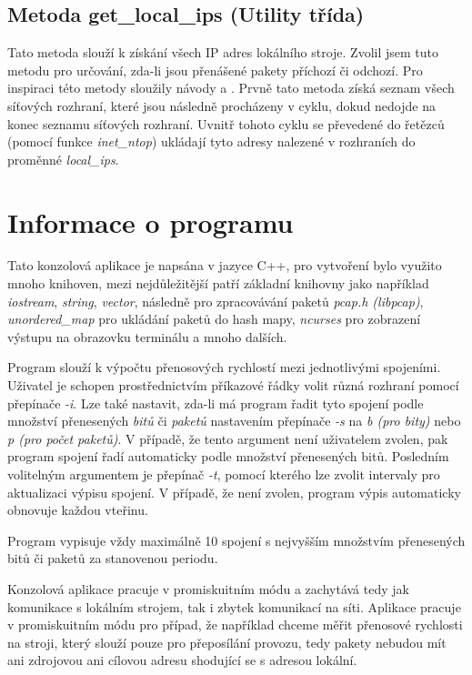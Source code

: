 \documentclass[a4paper, 11pt, hidelinks]{article}
\begin{document}
\subsection{Metoda get\_local\_ips (Utility třída)}
Tato metoda slouží k získání všech IP adres lokálního stroje. Zvolil jsem tuto metodu pro určování, zda-li jsou přenášené pakety příchozí či odchozí. Pro inspiraci této metody sloužily návody \cite{local_ips1} a \cite{local_ips2}. Prvně tato metoda získá seznam všech síťových rozhraní, které jsou následně procházeny v cyklu, dokud nedojde na konec seznamu síťových rozhraní. Uvnitř tohoto cyklu se převedené do řetězců (pomocí funkce \emph{inet\_ntop}) ukládají tyto adresy nalezené v rozhraních do proměnné \emph{local\_ips}.


\section{Informace o programu}
Tato konzolová aplikace je napsána v jazyce C++, pro vytvoření bylo využito mnoho knihoven, mezi nejdůležitější patří základní knihovny jako například \emph{iostream}, \emph{string}, \emph{vector}, následně pro zpracovávání paketů \emph{pcap.h (libpcap)},
\emph{unordered\_map} pro ukládání paketů do hash mapy, \emph{ncurses} pro zobrazení výstupu na obrazovku terminálu a mnoho dalších.

Program slouží k výpočtu přenosových rychlostí mezi jednotlivými spojeními. Uživatel je schopen prostřednictvím příkazové řádky volit různá rozhraní pomocí přepínače \emph{-i}. Lze také nastavit, zda-li má program řadit tyto spojení podle množství přenesených \emph{bitů} či \emph{paketů} nastavením přepínače \emph{-s} na \emph{b (pro bity)} nebo \emph{p (pro počet paketů)}. V případě, že tento argument není uživatelem zvolen, pak program spojení řadí automaticky podle množství přenesených bitů. Posledním volitelným argumentem je přepínač \emph{-t}, pomocí kterého lze zvolit intervaly pro aktualizaci výpisu spojení. V případě, že není zvolen, program výpis automaticky obnovuje každou vteřinu.

Program vypisuje vždy maximálně 10 spojení s nejvyšším množstvím přenesených bitů či paketů za stanovenou periodu.

Konzolová aplikace pracuje v promiskuitním módu a zachytává tedy jak komunikace s lokálním strojem, tak i zbytek komunikací na síti. Aplikace pracuje v promiskuitním módu pro případ, že například chceme měřit přenosové rychlosti na stroji, který slouží pouze pro přeposílání provozu, tedy pakety nebudou mít ani zdrojovou ani cílovou adresu shodující se s adresou lokální.
\end{document}
